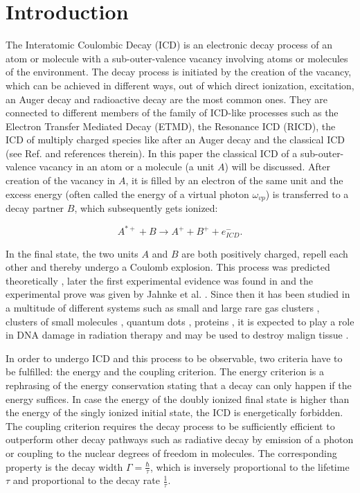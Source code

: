 \section{Introduction}

The Interatomic Coulombic Decay (ICD) is an electronic decay process of an atom or
molecule with a sub-outer-valence vacancy involving atoms or
molecules of the environment. The decay process is initiated by the creation
of the vacancy, which can be achieved in different ways, out of which
direct ionization, excitation, an Auger decay and radioactive decay are the
most common ones. They are connected to different members of the family
of ICD-like processes such as the Electron Transfer Mediated Decay (ETMD),
the Resonance ICD (RICD), the ICD of multiply charged species like after
an Auger decay and the classical ICD (see Ref. \cite{Hergenhahn11,Jahnke15}
and references therein).
In this paper the classical ICD of
a sub-outer-valence
vacancy in an atom or a molecule (a unit $A$) will be discussed. After
creation of the vacancy in $A$, it is filled
by an electron of the same unit and the excess energy (often called the energy of
a virtual photon $\omega_{vp}$) is transferred to a decay
partner $B$, which subsequently gets ionized:

\begin{equation*}
 A^{*+} + B \rightarrow A^+ + B^+ + e^-_{ICD}  .
\end{equation*}

In the final state,
the two units $A$ and $B$ are both positively charged, repell each other and
thereby undergo a Coulomb explosion. This process was predicted theoretically
\cite{Cederbaum97}, later the first experimental evidence was found in
\cite{Marburger03,Ohrwall04} and the experimental prove was given by Jahnke et al.
\cite{Jahnke04}. Since then
it has been studied in a multitude of different systems such as small and large
rare gas clusters \cite{Santra00_1,Santra01_1,Santra01_3,Averbukh06_1,
Lundwall07,Jahnke10,Forstel13,Mucke15,Fasshauer14_1},
clusters of small molecules \cite{Zobeley98,Pernpointner06,Mueller06,
Kryzhevoi11_1,Ghosh13a},
quantum dots \cite{Bande13}, proteins \cite{Harbach13}, it is expected
to play a role in DNA damage in radiation therapy \cite{Alizadeh15}
and may be used to destroy malign
tissue \cite{Gokhberg14,Trinter14}. 

In order to undergo ICD and this process to be observable, two criteria have to
be fulfilled: the energy and the coupling criterion. The energy criterion
is a rephrasing of the energy conservation stating that a decay can only
happen if the energy suffices. In case the energy of the
doubly ionized final
state is higher than the energy of the singly ionized initial state, the ICD
is energetically forbidden. The coupling criterion requires the decay
process to be sufficiently efficient to outperform other decay pathways
such as radiative decay by emission of a photon or coupling to the nuclear
degrees of freedom in molecules. The corresponding property is the
decay width $\Gamma = \frac{\hbar}{\tau}$, which is inversely proportional
to the lifetime $\tau$ and proportional to the decay rate $\frac{1}{\tau}$.

